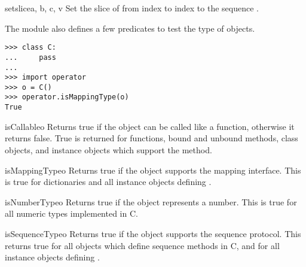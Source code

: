 \begin{funcdesc}{setslice}{a, b, c, v}
Set the slice of  from index  to index  to the
sequence .
\end{funcdesc}


The  module also defines a few predicates to test the
type of objects.  

\begin{verbatim}
>>> class C:
...     pass
... 
>>> import operator
>>> o = C()
>>> operator.isMappingType(o)
True
\end{verbatim}

\begin{funcdesc}{isCallable}{o}
Returns true if the object  can be called like a function,
otherwise it returns false.  True is returned for functions, bound and
unbound methods, class objects, and instance objects which support the
 method.
\end{funcdesc}

\begin{funcdesc}{isMappingType}{o}
Returns true if the object  supports the mapping interface.
This is true for dictionaries and all instance objects defining
.
\end{funcdesc}

\begin{funcdesc}{isNumberType}{o}
Returns true if the object  represents a number.  This is true
for all numeric types implemented in C.
\end{funcdesc}

\begin{funcdesc}{isSequenceType}{o}
Returns true if the object  supports the sequence protocol.
This returns true for all objects which define sequence methods in C,
and for all instance objects defining .
\end{funcdesc}


